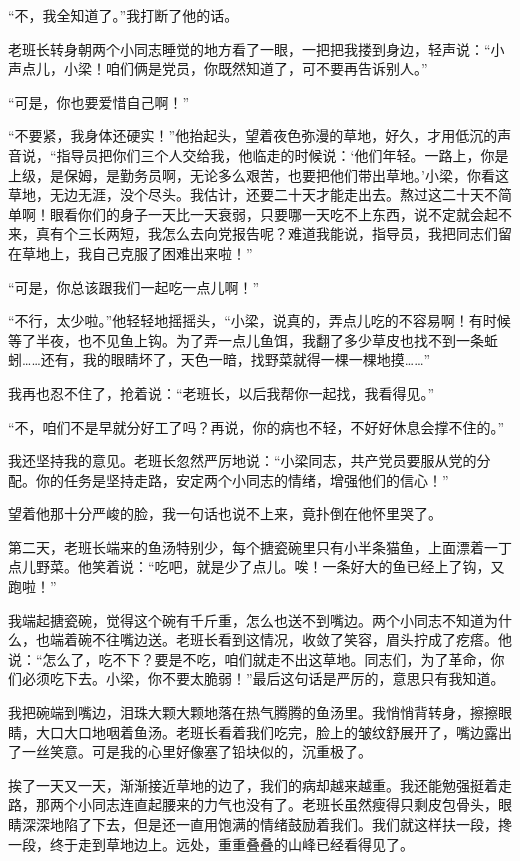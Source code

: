 \documentclass[12pt,UTF8]{ctexbook}
\begin{document}
“不，我全知道了。”我打断了他的话。

老班长转身朝两个小同志睡觉的地方看了一眼，一把把我搂到身边，轻声说：“小声点儿，小梁！咱们俩是党员，你既然知道了，可不要再告诉别人。”

“可是，你也要爱惜自己啊！”

“不要紧，我身体还硬实！”他抬起头，望着夜色弥漫的草地，好久，才用低沉的声音说，“指导员把你们三个人交给我，他临走的时候说：‘他们年轻。一路上，你是上级，是保姆，是勤务员啊，无论多么艰苦，也要把他们带出草地。’小梁，你看这草地，无边无涯，没个尽头。我估计，还要二十天才能走出去。熬过这二十天不简单啊！眼看你们的身子一天比一天衰弱，只要哪一天吃不上东西，说不定就会起不来，真有个三长两短，我怎么去向党报告呢？难道我能说，指导员，我把同志们留在草地上，我自己克服了困难出来啦！”

“可是，你总该跟我们一起吃一点儿啊！”

“不行，太少啦。”他轻轻地摇摇头，“小梁，说真的，弄点儿吃的不容易啊！有时候等了半夜，也不见鱼上钩。为了弄一点儿鱼饵，我翻了多少草皮也找不到一条蚯蚓……还有，我的眼睛坏了，天色一暗，找野菜就得一棵一棵地摸……”

我再也忍不住了，抢着说：“老班长，以后我帮你一起找，我看得见。”

“不，咱们不是早就分好工了吗？再说，你的病也不轻，不好好休息会撑不住的。”

我还坚持我的意见。老班长忽然严厉地说：“小梁同志，共产党员要服从党的分配。你的任务是坚持走路，安定两个小同志的情绪，增强他们的信心！”

望着他那十分严峻的脸，我一句话也说不上来，竟扑倒在他怀里哭了。

第二天，老班长端来的鱼汤特别少，每个搪瓷碗里只有小半条猫鱼，上面漂着一丁点儿野菜。他笑着说：“吃吧，就是少了点儿。唉！一条好大的鱼已经上了钩，又跑啦！”

我端起搪瓷碗，觉得这个碗有千斤重，怎么也送不到嘴边。两个小同志不知道为什么，也端着碗不往嘴边送。老班长看到这情况，收敛了笑容，眉头拧成了疙瘩。他说：“怎么了，吃不下？要是不吃，咱们就走不出这草地。同志们，为了革命，你们必须吃下去。小梁，你不要太脆弱！”最后这句话是严厉的，意思只有我知道。

我把碗端到嘴边，泪珠大颗大颗地落在热气腾腾的鱼汤里。我悄悄背转身，擦擦眼睛，大口大口地咽着鱼汤。老班长看着我们吃完，脸上的皱纹舒展开了，嘴边露出了一丝笑意。可是我的心里好像塞了铅块似的，沉重极了。

挨了一天又一天，渐渐接近草地的边了，我们的病却越来越重。我还能勉强挺着走路，那两个小同志连直起腰来的力气也没有了。老班长虽然瘦得只剩皮包骨头，眼睛深深地陷了下去，但是还一直用饱满的情绪鼓励着我们。我们就这样扶一段，搀一段，终于走到草地边上。远处，重重叠叠的山峰已经看得见了。
\end{document}
